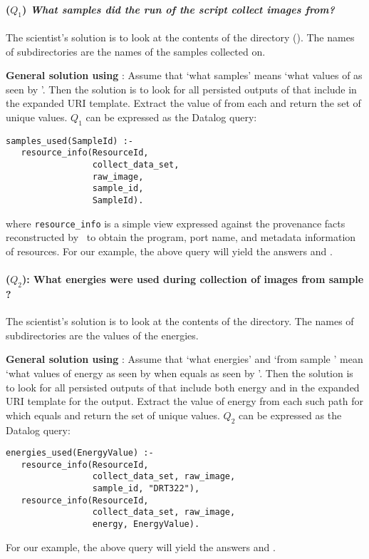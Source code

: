 \paragraph{($Q_1$) \emph{What samples did the run of the script
  collect images from?}} 
The scientist's solution is to look at the contents of the
 directory (). The names of
subdirectories are the names of the samples collected on.

\textbf{General solution using \yw}: Assume that `what samples' means
`what values of  as seen by
'. Then the solution is to look for all
persisted outputs of  that include
 in the expanded URI template.
Extract the value of  from each and return the set of
unique values. $Q_1$ can be expressed as the Datalog query:
\begin{small}
\begin{verbatim}
samples_used(SampleId) :- 
   resource_info(ResourceId, 
                 collect_data_set,
                 raw_image,
                 sample_id,
                 SampleId).
\end{verbatim}
\end{small}
where {\tt resource\_info} is a simple view expressed against the
provenance facts reconstructed by \yw\ to obtain the program, port
name, and metadata information of resources.  For our example, the
above query will yield the answers  and .


\paragraph{($Q_2$): What energies were used during collection of
  images from sample ?}
The scientist's solution is to look at the contents of the
 directory. The names of subdirectories are
the values of the energies.

\textbf{General solution using \yw}: Assume that `what energies' and
`from sample ' mean `what values of energy as seen by
 when  equals 
as seen by '.  Then the solution is to look
for all persisted outputs of  that include
both energy and  in the expanded URI template for the
output.  Extract the value of energy from each such path for which
 equals  and return the set of unique
values. $Q_2$ can be expressed as the Datalog query: 
\begin{small}
\begin{verbatim}
energies_used(EnergyValue) :-
   resource_info(ResourceId, 
                 collect_data_set, raw_image, 
                 sample_id, "DRT322"),
   resource_info(ResourceId, 
                 collect_data_set, raw_image, 
                 energy, EnergyValue).
\end{verbatim}
\end{small}
For our example, the above query will yield the answers 
and .

